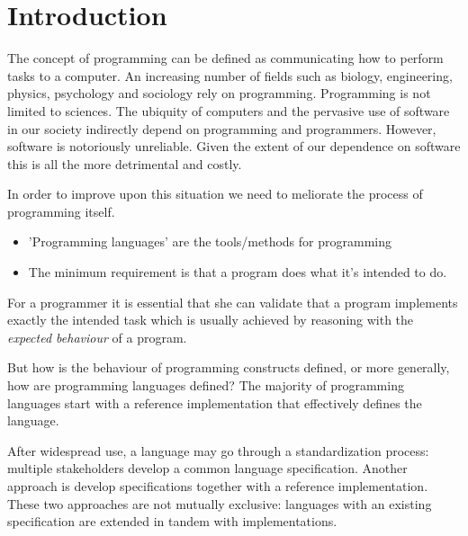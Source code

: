 { %

\newcommand{\stlcbool}{\ensuremath{\lambda_{\mathbb{B}}}\xspace}
\newcommand{\bool}{\text{bool}}
\newcommand{\true}{\textbf{true}\xspace}
\newcommand{\false}{\textbf{false}\xspace}
\newcommand{\ite}[3]{\textbf{if}~{#1}~\textbf{then}~{#2}~\textbf{else}~{#3}}
\newcommand{\typing}[3]{{#1} \vdash {#2} : {#3}}
\renewcommand{\eval}[2]{{#1} \longrightarrow {#2}}
\newcommand{\evals}[2]{{#1} \longrightarrow^* {#2}}

\chapter{Introduction}

The concept of programming can be defined as communicating how to perform tasks
to a computer. An increasing number of fields such as biology, engineering,
physics, psychology and sociology rely on programming. Programming is not
limited to sciences. The ubiquity of computers and the pervasive use of software
in our society indirectly depend on programming and programmers.  However,
software is notoriously unreliable. Given the extent of our dependence on
software this is all the more detrimental and costly.

In order to improve upon this situation we need to meliorate the process of
programming itself.
\begin{itemize}
\item 'Programming languages' are the tools/methods for programming
\item The minimum requirement is that a program does what it's intended to do.
\end{itemize}

For a programmer it is essential that she can validate that a program implements
exactly the intended task which is usually achieved by reasoning with the
\emph{expected behaviour} of a program.

But how is the behaviour of programming constructs defined, or more generally,
how are programming languages defined? The majority of programming languages
start with a reference implementation that effectively defines the language.

After widespread use, a language may go through a standardization process:
multiple stakeholders develop a common language specification.
Another approach is develop specifications together with a reference
implementation. These two approaches are not mutually exclusive: languages with
an existing specification are extended in tandem with implementations.

}
